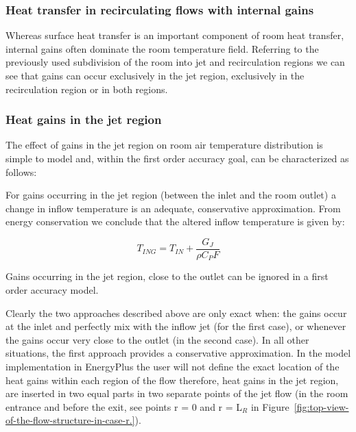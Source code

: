\subsubsection{Heat transfer in recirculating flows with internal gains}\label{heat-transfer-in-recirculating-flows-with-internal-gains}

Whereas surface heat transfer is an important component of room heat transfer, internal gains often dominate the room temperature field. Referring to the previously used subdivision of the room into jet and recirculation regions we can see that gains can occur exclusively in the jet region, exclusively in the recirculation region or in both regions.

\subsubsection{Heat gains in the jet region}\label{heat-gains-in-the-jet-region}

The effect of gains in the jet region on room air temperature distribution is simple to model and, within the first order accuracy goal, can be characterized as follows:

For gains occurring in the jet region (between the inlet and the room outlet) a change in inflow temperature is an adequate, conservative approximation. From energy conservation we conclude that the altered inflow temperature is given by:

\begin{equation}
{T_{ING}} = {T_{IN}} + \frac{{{G_J}}}{{\rho {C_P}F}}
\label{eq:AlteredInflowTempEquation}
\end{equation}

Gains occurring in the jet region, close to the outlet can be ignored in a first order accuracy model.

Clearly the two approaches described above are only exact when: the gains occur at the inlet and perfectly mix with the inflow jet (for the first case), or whenever the gains occur very close to the outlet (in the second case). In all other situations, the first approach provides a conservative approximation. In the model implementation in EnergyPlus the user will not define the exact location of the heat gains within each region of the flow therefore, heat gains in the jet region, are inserted in two equal parts in two separate points of the jet flow (in the room entrance and before the exit, see points r = 0 and r = L\(_{R}\) in Figure~\ref{fig:top-view-of-the-flow-structure-in-case-r.}).

